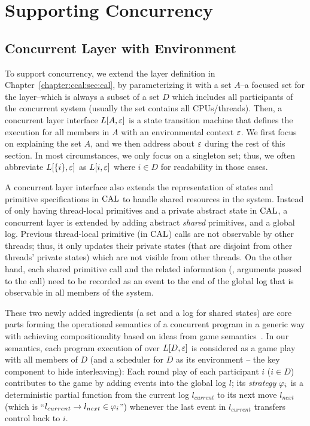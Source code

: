 \section{Supporting Concurrency}
\label{chapter:ccal:sec:ccal-overview}

\subsection{Concurrent Layer with Environment}
\label{chapter:ccal:subsec:concurrent-layer-with-environment}

To support concurrency, 
we extend the layer definition in Chapter~\ref{chapter:ccal:sec:cal},
by parameterizing it with a set $A$--a focused set for the layer--which is always a subset of a set $D$ which includes all participants of the concurrent system (usually the set contains all CPUs/threads).
Then, a concurrent layer interface $L[A, {\varepsilon}]$ is a state transition machine
that defines the execution for all members in $A$ with an environmental context ${\varepsilon}$.
We first focus on explaining the set $A$, and we then address about ${\varepsilon}$ during the rest of this section.
In most circumstances, we only focus on a singleton set; 
thus, we often abbreviate $L[\{i\},{\varepsilon}]$ as $L[i, {\varepsilon}]$ where $i\in{}D$ for readability in those cases.


A concurrent layer interface also extends the representation of states and primitive specifications in $\mathrm{CAL}$ to handle shared resources in the system. 
Instead of only having thread-local primitives and a private abstract state in $\mathrm{CAL}$, 
a concurrent layer is extended by adding abstract \textit{shared} primitives, 
and a global log. 
Previous thread-local primitive (in $\mathrm{CAL}$) calls are not observable by other threads; thus, it only updates their private states (that are disjoint from other threads' private states) which are not visible from other threads. 
On the other hand, each shared primitive call and the related information (\ie, arguments passed to the call) 
need to be recorded as an event to the end of the global log that
is observable in all members of the system.

These two newly added ingredients (a set and a log for shared states)  are core parts forming the operational semantics of a concurrent program 
 in a generic way with achieving  compositionality based on
ideas from game semantics~\cite{gsinvite}. 
In our semantics, 
each program execution of  over 
$L[D, {\varepsilon}]$ is considered as a game play with all members of $D$ 
(and a scheduler for $D$ as its environment -- the key component to hide interleaving):
Each round play of each participant $i$ ($i\in{}D$) contributes to the game 
by adding events into the global log $l$; its {\em strategy}
$\varphi_{i}$ is a deterministic partial function from
the current log $l_{current}$ to its next move $l_{next}$ (which is ``$l_{current} \rightarrow l_{next} \in \varphi_{i}$'') whenever
the last event in $l_{current}$ transfers control back to $i$. 

